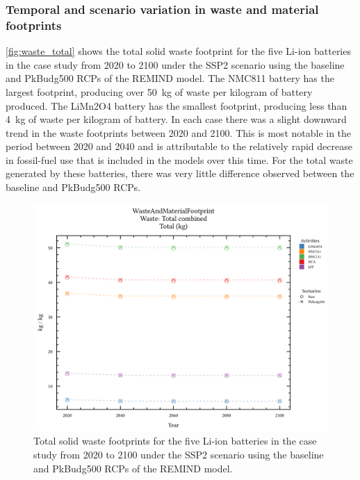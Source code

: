 \subsubsection{Temporal and scenario variation in waste and material footprints}\label{sec:results-case_study-total_footprints}

\autoref{fig:waste_total} shows the total solid waste footprint for the five Li-ion batteries in the case study from 2020 to 2100 under the SSP2 scenario using the baseline and PkBudg500 RCPs of the REMIND model. The NMC811 battery has the largest footprint, producing over 50~kg of waste per kilogram of battery produced. The LiMn2O4 battery has the smallest footprint, producing less than 4~kg of waste per kilogram of battery. In each case there was a slight downward trend in the waste footprints between 2020 and 2100. This is most notable in the period between 2020 and 2040 and is attributable to the relatively rapid decrease in fossil-fuel use that is included in the models over this time. For the total waste generated by these batteries, there was very little difference observed between the baseline and PkBudg500 RCPs.


\begin{figure}[ht!]
    \centering
    \includegraphics[width=\linewidth]{figures/total_waste.png}
    \caption{Total solid waste footprints for the five Li-ion batteries in the case study from 2020 to 2100 under the SSP2 scenario using the baseline and PkBudg500 RCPs of the REMIND model.}\label{fig:waste_total}
\end{figure}


